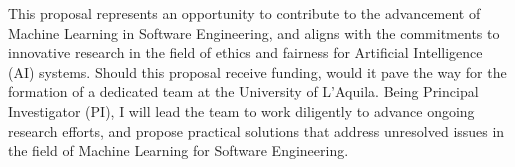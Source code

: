 \documentclass[10pt,notitlepage]{article}
\begin{document}

%




This proposal represents an opportunity to contribute to the advancement of Machine Learning in Software Engineering, and aligns with the commitments to innovative research in the field of ethics and fairness for Artificial Intelligence (AI) systems. %
Should this proposal receive funding, would it pave the way for the formation of a dedicated %
team at the University of L'Aquila. Being Principal Investigator (PI), I will lead the team to work diligently to advance ongoing research efforts, and propose practical solutions that address unresolved issues in the field of Machine Learning for Software Engineering. 
\end{document}
